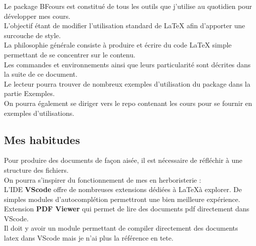 Le package BFcours est constitué de tous les outils que j'utilise au quotidien pour développer mes cours. \\

L'objectif étant de modifier l'utilisation standard de LaTeX afin d'apporter une surcouche de style. \\

La philosophie générale consiste à produire et écrire du code LaTeX simple permettant de se concentrer sur le contenu. \\

Les commandes et environnements ainsi que leurs particularité sont décrites dans la suite de ce document. \\
Le lecteur pourra trouver de nombreux exemples d'utilisation du package dans la partie Exemples. \\
On pourra également se diriger vers le repo contenant les cours pour se fournir en exemples d'utilisations. 


\subsection{Mes habitudes}

Pour produire des documents de façon aisée, il est nécessaire de réfléchir à une structure des fichiers. \\

On pourra s'inspirer du fonctionnement de mes  en herboristerie : \\

L'IDE \textbf{VScode} offre de nombreuses extensions dédiées à \LaTeX à explorer. De simples modules d'autocomplétion permettront une bien meilleure expérience. \\

Extension \textbf{PDF Viewer} qui permet de lire des documents pdf directement dans VScode.\\
Il doit y avoir un module permettant de compiler directement des documents latex dans VScode mais je n'ai plus la référence en tete. 
